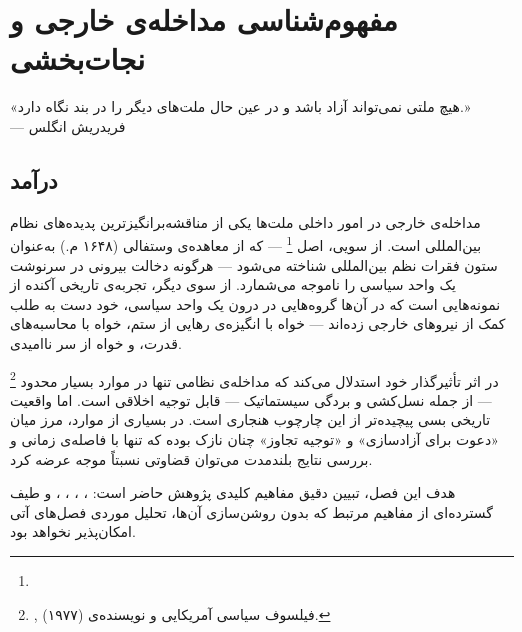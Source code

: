 
\chapter{مفهوم‌شناسی مداخله‌ی خارجی و نجات‌بخشی}
\label{ch:concepts}

\begin{tcolorbox}[quotebox, title={}]
«هیچ ملتی نمی‌تواند آزاد باشد و در عین حال ملت‌های دیگر را در بند نگاه دارد.»\\
\hfill --- فریدریش انگلس
\end{tcolorbox}

\section{درآمد}
\label{sec:ch01-intro}

مداخله‌ی خارجی در امور داخلی ملت‌ها یکی از مناقشه‌برانگیزترین پدیده‌های
نظام بین‌المللی است. از سویی، اصل %
\footnote{}
--- که از معاهده‌ی وستفالی (۱۶۴۸ م.) به‌عنوان ستون فقرات نظم بین‌المللی
شناخته می‌شود --- هرگونه دخالت بیرونی در سرنوشت یک واحد سیاسی را ناموجه
می‌شمارد. از سوی دیگر، تجربه‌ی تاریخی آکنده از نمونه‌هایی است که در آن‌ها
گروه‌هایی در درون یک واحد سیاسی، خود دست به طلب کمک از نیروهای خارجی
زده‌اند --- خواه با انگیزه‌ی رهایی از ستم، خواه با محاسبه‌های قدرت، و
خواه از سر ناامیدی.

%
\footnote{,
فیلسوف سیاسی آمریکایی و نویسنده‌ی  (۱۹۷۷).}
در اثر تأثیرگذار خود استدلال می‌کند که مداخله‌ی نظامی تنها در موارد بسیار
محدود --- از جمله نسل‌کشی و بردگی سیستماتیک --- قابل توجیه اخلاقی
است.
اما واقعیت تاریخی بسی پیچیده‌تر از این چارچوب هنجاری است. در بسیاری از موارد، مرز میان «دعوت برای آزادسازی» و «توجیه تجاوز» چنان نازک بوده که تنها با فاصله‌ی زمانی و بررسی نتایج بلندمدت می‌توان قضاوتی نسبتاً موجه عرضه کرد.

هدف این فصل، تبیین دقیق مفاهیم کلیدی پژوهش حاضر است: ، ، ، ، و طیف گسترده‌ای از مفاهیم مرتبط که بدون روشن‌سازی آن‌ها، تحلیل
موردی فصل‌های آتی امکان‌پذیر نخواهد بود.


